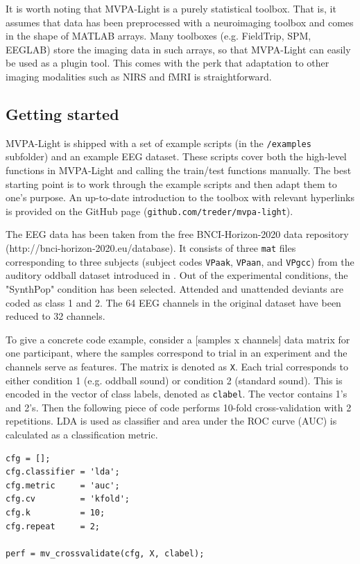 \documentclass[utf8]{frontiersSCNS} %
\newcommand{\ttt}[1]{\texttt{#1}}
\begin{document}
It is worth noting that MVPA-Light is a purely statistical toolbox. That is, it assumes that data has been preprocessed with a neuroimaging toolbox and comes in the shape of MATLAB arrays. Many toolboxes (e.g. FieldTrip, SPM, EEGLAB) store the imaging  data in such arrays, so that MVPA-Light can easily be used as a plugin tool. This comes with the perk that adaptation to other imaging modalities such as NIRS and fMRI is straightforward.

\subsection{Getting started}

MVPA-Light is shipped with a set of example scripts (in the \ttt{/examples} subfolder) and an example EEG dataset. These scripts cover both the high-level functions in MVPA-Light and calling the train/test functions manually. The best starting point is to work through the example scripts and then adapt them to one's purpose. An up-to-date introduction to the toolbox with relevant hyperlinks is provided on the GitHub page (\ttt{github.com/treder/mvpa-light}).

The EEG data has been taken from the free BNCI-Horizon-2020 data repository (http://bnci-horizon-2020.eu/database). It consists of three \ttt{mat} files corresponding to three subjects (subject codes \ttt{VPaak}, \ttt{VPaan}, and \ttt{VPgcc}) from the auditory oddball dataset introduced in \cite{Treder2014}. Out of the experimental conditions, the "SynthPop" condition has been selected. Attended and unattended deviants are coded as class 1 and 2. The 64 EEG channels in the original dataset have been reduced to 32 channels.

To give a concrete code example, consider a [samples x channels] data matrix for one participant, where the samples correspond to trial in an experiment and the channels serve as features. The matrix is denoted as \ttt{X}. Each trial corresponds to either condition 1 (e.g. oddball sound) or condition 2 (standard sound). This is encoded in the vector of class labels, denoted as \ttt{clabel}. The vector contains 1's and 2's. Then the following piece of code performs 10-fold cross-validation with 2 repetitions. LDA is used as classifier and area under the ROC curve (AUC) is calculated as a classification metric.

\begin{verbatim}
cfg = [];
cfg.classifier = 'lda';
cfg.metric     = 'auc';
cfg.cv         = 'kfold';
cfg.k          = 10;
cfg.repeat     = 2;

perf = mv_crossvalidate(cfg, X, clabel);
\end{verbatim}
\end{document}
